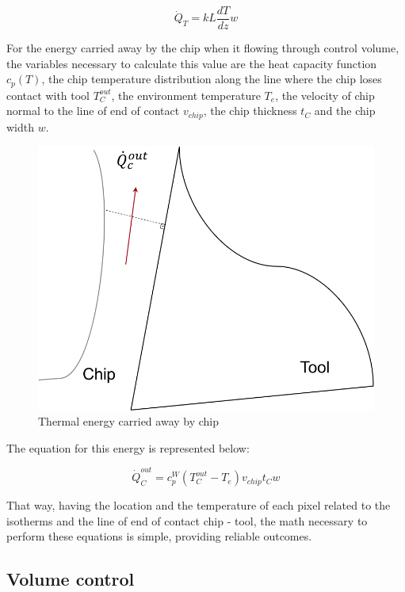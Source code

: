 	\begin{equation} 
	\label{eq_heattool}
		\dot{Q}_{T} = kL\frac{dT}{dz}w
	\end{equation}

	For the energy carried away by the chip when it flowing through control volume, the variables necessary to calculate this value are the heat capacity function $c_{p}(T)$, the chip temperature distribution along the line where the chip loses contact with tool $T_{C}^{out}$, the environment temperature $T_{e}$, the velocity of chip normal to the line of end of contact $v_{chip}$, the chip thickness $t_{C}$ and the chip width $w$.

	\begin{figure}[H]
		\centering
		\captionsetup{justification=centering}
		\includegraphics[scale=0.6]{Cap4/energyChip.png}
		\caption{Thermal energy carried away by chip}
		\label{fig:energychip}
	\end{figure}

	The equation for this energy is represented below:

	\begin{equation} 
	\label{eq_energychip}
		\dot{Q}_{C}^{out} = c_{p}^{W}(T_{C}^{out} - T_{e})v_{chip}t_{C}w
	\end{equation}

	That way, having the location and the temperature of each pixel related to the isotherms and the line of end of contact chip - tool, the math necessary to perform these equations is simple, providing reliable outcomes.

	\subsection{Volume control}

